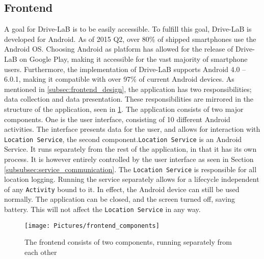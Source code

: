 \subsection{Frontend}\label{subsec:frontend_implementation}
A goal for Drive-LaB is to be easily accessible. To fulfill this goal, Drive-LaB is developed for Android. As of 2015 Q2, over 80\% of shipped smartphones use the Android OS\citep{smartphone_market_share}. Choosing Android as platform has allowed for the release of Drive-LaB on Google Play\citep{google_play_drivelab}, making it accessible for the vast majority of smartphone users. Furthermore, the implementation of Drive-LaB supports Android 4.0 – 6.0.1, making it compatible with over 97\% of current Android devices\citep{android_version_distribution}.
As mentioned in \ref{subsec:frontend_design}, the application has two responsibilities; data collection and data presentation. These responsibilities are mirrored in the structure of the application, seen in \ref{fig:frontend_components}. The application consists of two major components. One is the user interface, consisting of 10 different Android activities\citep{android_activity}. The interface presents data for the user, and allows for interaction with \texttt{Location Service}, the second component.\texttt{Location Service} is an Android Service\citep{android_service}. It runs separately from the rest of the application, in that it has its own process. It is however entirely controlled by the user interface as seen in Section \ref{subsubsec:service_communication}. The \texttt{Location Service} is responsible for all location logging. Running the service separately allows for a lifecycle independent of any \texttt{Activity} bound to it. In effect, the Android device can still be used normally. The application can be closed, and the screen turned off, saving battery. This will not affect the \texttt{Location Service} in any way.

\begin{figure}[tb]
\centering
\texttt{[image: Pictures/frontend\_components]}
\caption{The frontend consists of two components, running separately from each other}
\label{fig:frontend_components}
\end{figure}

